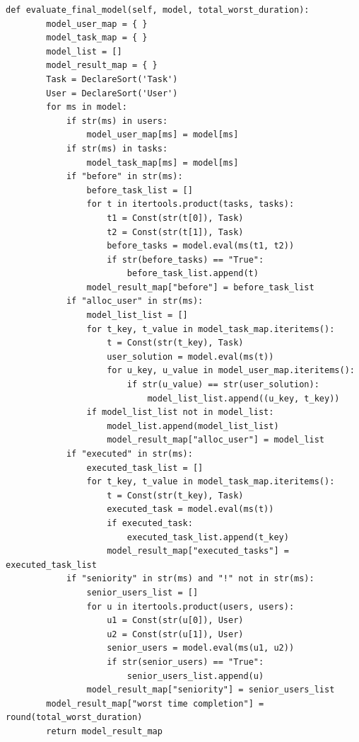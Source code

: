 \documentclass[a4paper]{report}
\begin{document}
\begin{lstlisting}[frame=single]
def evaluate_final_model(self, model, total_worst_duration):
        model_user_map = { }
        model_task_map = { }
        model_list = []
        model_result_map = { }
        Task = DeclareSort('Task')
        User = DeclareSort('User')
        for ms in model:
            if str(ms) in users:
                model_user_map[ms] = model[ms]
            if str(ms) in tasks:
                model_task_map[ms] = model[ms]
            if "before" in str(ms):
                before_task_list = []
                for t in itertools.product(tasks, tasks):
                    t1 = Const(str(t[0]), Task)
                    t2 = Const(str(t[1]), Task)
                    before_tasks = model.eval(ms(t1, t2))
                    if str(before_tasks) == "True":
                        before_task_list.append(t)
                model_result_map["before"] = before_task_list
            if "alloc_user" in str(ms):
                model_list_list = []
                for t_key, t_value in model_task_map.iteritems():
                    t = Const(str(t_key), Task)
                    user_solution = model.eval(ms(t))
                    for u_key, u_value in model_user_map.iteritems():
                        if str(u_value) == str(user_solution):
                            model_list_list.append((u_key, t_key))
                if model_list_list not in model_list:
                    model_list.append(model_list_list)
                    model_result_map["alloc_user"] = model_list
            if "executed" in str(ms):
                executed_task_list = []
                for t_key, t_value in model_task_map.iteritems():
                    t = Const(str(t_key), Task)
                    executed_task = model.eval(ms(t))
                    if executed_task:
                        executed_task_list.append(t_key)
                    model_result_map["executed_tasks"] = executed_task_list
            if "seniority" in str(ms) and "!" not in str(ms):
                senior_users_list = []
                for u in itertools.product(users, users):
                    u1 = Const(str(u[0]), User)
                    u2 = Const(str(u[1]), User)
                    senior_users = model.eval(ms(u1, u2))
                    if str(senior_users) == "True":
                        senior_users_list.append(u)
                model_result_map["seniority"] = senior_users_list
        model_result_map["worst time completion"] = round(total_worst_duration)
        return model_result_map
\end{lstlisting}
\end{document}
